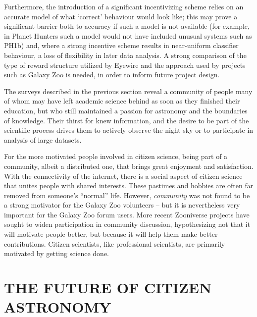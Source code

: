 \documentclass{ar2e}
\begin{document}
Furthermore, the introduction of a significant incentivizing scheme relies on an
accurate model of what `correct' behaviour would look like; this may prove a
significant barrier both to accuracy if such a model is not available (for
example, in Planet Hunters such a model would not have included unusual systems
such as PH1b) and, where a strong incentive scheme results in near-uniform
classifier behaviour, a loss of flexibility in later data analysis. 
A strong comparison of the type of reward structure utilized by Eyewire and the
approach used by projects such as Galaxy Zoo is needed, in order to
inform future project design. 

The surveys described in the previous section reveal a community of people many
of whom may have left   academic science behind as soon as they finished their 
education, but who still maintained a passion for astronomy and the  boundaries
of knowledge.  Their thirst for knew information, and the  desire to be part of
the  scientific process drives them to actively observe the  night sky or to
participate in analysis of large datasets.  

For the more motivated people involved in citizen science, being part of a
community,  albeit a distributed one, that brings great enjoyment and
satisfaction.  With the connectivity of the internet, there is a social  aspect
of citizen science that unites people with shared interests.   These pastimes
and hobbies are often far removed from someone's ``normal''  life. However, {\it
community} was not found to be a strong motivator for the Galaxy Zoo volunteers
-- but it is nevertheless very important for the Galaxy Zoo forum users. More
recent Zooniverse projects have sought to widen participation in community
discussion, hypothesizing not that it will motivate people better, but because
it will help them make better contributions. Citizen scientists, like
professional scientists, are primarily motivated by getting science done.



\section{THE FUTURE OF CITIZEN ASTRONOMY}
\label{sec:future}

\end{document}
